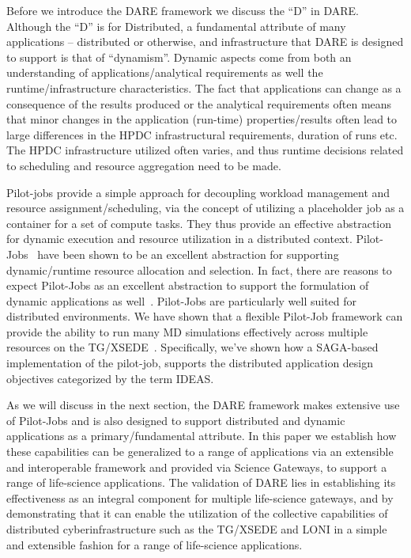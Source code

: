 \documentclass[]{svjour3}
\begin{document}
Before we introduce the DARE framework we discuss the ``D'' in
DARE. Although the ``D'' is for Distributed, a fundamental attribute
of many applications -- distributed or otherwise, and infrastructure
that DARE is designed to support is that of ``dynamism''.  Dynamic
aspects come from both an understanding of applications/analytical
requirements as well the runtime/infrastructure characteristics.  The
fact that applications can change as a consequence of the results
produced or the analytical requirements often means that minor changes
in the application (run-time) properties/results often lead to large
differences in the HPDC infrastructural requirements, duration of runs
etc. The HPDC infrastructure utilized often varies, and thus runtime
decisions related to scheduling and resource aggregation need to be made.


Pilot-jobs provide a simple approach for decoupling workload
management and resource assignment/scheduling, via the concept of
utilizing a placeholder job as a container for a set of compute tasks.
They thus provide an effective abstraction for dynamic execution and
resource utilization in a distributed context.
Pilot-Jobs~\cite{pstar11} have been shown to be an excellent
abstraction for supporting dynamic/runtime resource allocation and
selection.  In fact, there are reasons to expect Pilot-Jobs as an
excellent abstraction to support the formulation of dynamic
applications as well~\cite{pstar11}. Pilot-Jobs are particularly well
suited for distributed environments.  We have shown that a flexible
Pilot-Job framework can provide the ability to run many MD simulations
effectively across multiple resources on the
TG/XSEDE~\cite{saga-royalsoc,saga_bigjob_condor_cloud}.  Specifically,
we've shown how a SAGA-based implementation of the pilot-job, supports
the distributed application design objectives categorized by the term
IDEAS\cite{ideas}.

As we will discuss in the next section, the DARE framework makes
extensive use of Pilot-Jobs and is also designed to support
distributed and dynamic applications as a primary/fundamental
attribute.  In this paper we establish how these capabilities can be
generalized to a range of applications via an extensible and
interoperable framework and provided via Science Gateways, to support
a range of life-science applications.  The validation of DARE lies in
establishing its effectiveness as an integral component for multiple
life-science gateways, and by demonstrating that it can enable the
utilization of the collective capabilities of distributed
cyberinfrastructure such as the TG/XSEDE and LONI in a simple and
extensible fashion for a range of life-science applications.
\end{document}
